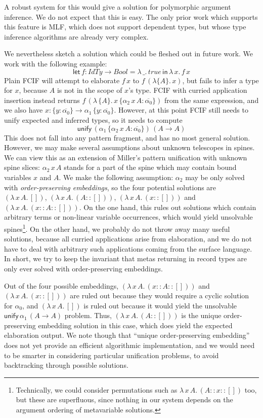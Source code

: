 \documentclass[acmsmall,screen,dvipsnames]{acmart}\settopmatter{}
\newcommand{\slet}{\boldsymbol{\mathsf{let}}}
\renewcommand{\sin}{\boldsymbol{\mathsf{in}}}
\newcommand{\unify}{\mathsf{unify}}
\newcommand{\mi}[1]{\mathit{#1}}
\newcommand{\ol}[1]{\overline{#1}}
\theoremstyle{remark}
\begin{document}
A robust system for this would give a solution for polymorphic argument
inference. We do not expect that this is easy. The only prior work which
supports this feature is MLF, which does not support dependent types, but whose
type inference algorithms are already very complex.

We nevertheless sketch a solution which could be fleshed out in future work. We
work with the following example:
\[
  \slet\,f : \mi{IdTy} \to \mi{Bool} = \lambda\,\_.\,\mi{true}\,\sin\,\lambda\,x.\,f\,x
\]
Plain FCIF will attempt to elaborate $f\,x$ to $f\,(\lambda\{A\}.\,x)$, but
fails to infer a type for $x$, because $A$ is not in the scope of $x$'s type.
FCIF with curried application insertion instead returns
$f\,(\lambda\,\{A\}.\,x\,\{\alpha_2\,x\,A : \ol{\alpha_0}\})$ from the same
expression, and we also have $x : \{y : \ol{\alpha_0}\}\to \alpha_1\,\{y :
\ol{\alpha_0}\}$. However, at this point FCIF still needs to unify expected and
inferred types, so it needs to compute
\[
\unify\,(\alpha_1\,\{\alpha_2\,x\,A : \ol{\alpha_0}\})\,(A \to A)
\]
This does not fall into any pattern fragment, and has no most general solution.
However, we may make several assumptions about unknown telescopes in spines. We
can view this as an extension of Miller's pattern unification
\cite{millerpattern} with unknown spine slices: $\alpha_2\,x\,A$ stands for a
part of the spine which may contain bound variables $x$ and $A$. We make the
following assumption: $\alpha_2$ may be only solved with \emph{order-preserving
  embeddings}, so the four potential solutions are $(\lambda\,x\,A.\,[])$,
$(\lambda\,x\,A.\,(A :: []))$, $(\lambda\,x\,A.\,(x :: []))$ and
$(\lambda\,x\,A.\,(x :: A :: []))$. On the one hand, this rules out solutions which
contain arbitrary terms or non-linear variable occurrences, which would yield
unsolvable spines\footnote{Technically, we could consider
  permutations such as $\lambda\,x\,A.\,(A :: x :: [])$ too, but these are
  superfluous, since nothing in our system depends on the argument ordering of
  metavariable solutions.}. On the other hand, we probably do not throw away many useful
solutions, because all curried applications arise from elaboration, and we do
not have to deal with arbitrary such applications coming from the surface
language. In short, we try to keep the invariant that metas returning in record
types are only ever solved with order-preserving embeddings.

Out of the four possible embeddings, $(\lambda\,x\,A.\,(x :: A :: []))$ and
$(\lambda\,x\,A.\,(x :: []))$ are ruled out because they would require a cyclic
solution for $\alpha_0$, and $(\lambda\,x\,A.\,[])$ is ruled out because it
would yield the unsolvable $\unify\,\alpha_1\,(A \to A)$ problem. Thus,
$(\lambda\,x\,A.\,(A :: []))$ is the unique order-preserving embedding solution
in this case, which does yield the expected elaboration output. We note though
that ``unique order-preserving embedding'' does not yet provide an efficient
algorithmic implementation, and we would need to be smarter in considering
particular unification problems, to avoid backtracking through possible
solutions.
\end{document}
